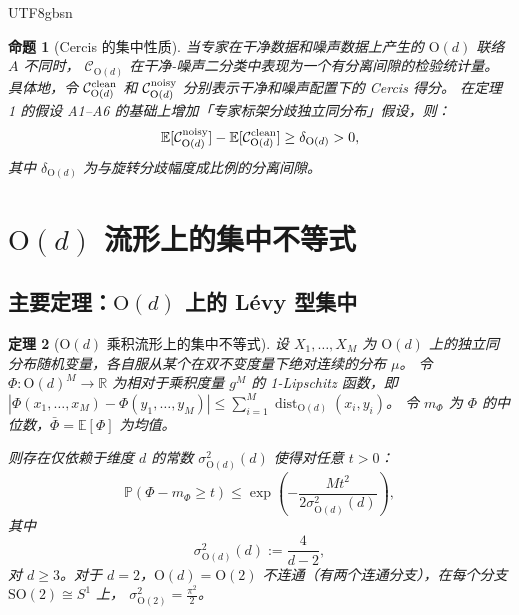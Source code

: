 \documentclass[12pt,a4paper]{article}
\theoremstyle{plain}
\newtheorem{theorem}{定理}[section]
\newtheorem{proposition}[theorem]{命题}
\theoremstyle{definition}
\theoremstyle{remark}
\newcommand{\R}{\mathbb{R}}
\newcommand{\E}{\mathbb{E}}
\newcommand{\Pbb}{\mathbb{P}}
\newcommand{\Od}{\mathrm{O}(d)}
\newcommand{\SO}{\mathrm{SO}}
\newcommand{\cercis}{\mathcal{C}}
\DeclareMathOperator{\dist}{dist}
\begin{document}
\begin{CJK}{UTF8}{gbsn}
\begin{proposition}[Cercis 的集中性质]\label{prop:cercis_concentration}
当专家在干净数据和噪声数据上产生的 $\Od$ 联络 $A$ 不同时，
$\cercis_{\Od}$ 在干净-噪声二分类中表现为一个有分离间隙的检验统计量。
具体地，令 $\cercis_{\Od}^{\rm clean}$ 和 $\cercis_{\Od}^{\rm noisy}$ 分别表示干净和噪声配置下的 Cercis 得分。
在定理 1 的假设 A1--A6 的基础上增加「专家标架分歧独立同分布」假设，则：
\begin{equation}
    \E[\cercis_{\Od}^{\rm noisy}] - \E[\cercis_{\Od}^{\rm clean}] \geq \delta_{\Od} > 0,
\end{equation}
其中 $\delta_{\Od}$ 为与旋转分歧幅度成比例的分离间隙。
\end{proposition}

\newpage

\section{$\Od$ 流形上的集中不等式}

\subsection{主要定理：$\Od$ 上的 Lévy 型集中}

\begin{theorem}[$\Od$ 乘积流形上的集中不等式]\label{thm:main}
设 $X_1, \ldots, X_M$ 为 $\Od$ 上的独立同分布随机变量，各自服从某个在双不变度量下绝对连续的分布 $\mu$。
令 $\Phi: \Od^M \to \R$ 为相对于乘积度量 $g^M$ 的 1-Lipschitz 函数，即
$|\Phi(x_1, \ldots, x_M) - \Phi(y_1, \ldots, y_M)| \leq \sum_{i=1}^M \dist_{\Od}(x_i, y_i)$。
令 $m_\Phi$ 为 $\Phi$ 的中位数，$\bar{\Phi} = \E[\Phi]$ 为均值。

则存在仅依赖于维度 $d$ 的常数 $\sigma_{\Od}^2(d)$ 使得对任意 $t > 0$：
\begin{equation}\label{eq:main_bound}
    \Pbb(\Phi - m_\Phi \geq t) \leq \exp\!\left(-\frac{M t^2}{2\sigma_{\Od}^2(d)}\right),
\end{equation}
其中
\begin{equation}\label{eq:sigma_od}
    \sigma_{\Od}^2(d) := \frac{4}{d-2},
\end{equation}
对 $d \geq 3$。对于 $d = 2$，$\Od = \mathrm{O}(2)$ 不连通（有两个连通分支），在每个分支 $\SO(2) \cong S^1$ 上，
$\sigma_{\mathrm{O}(2)}^2 = \frac{\pi^2}{2}$。


\end{theorem}
\end{CJK}
\end{document}
